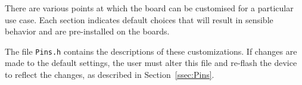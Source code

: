 \documentclass[11pt]{report}
\begin{document}
There are various points at which the board can be customised for a particular use case. Each section indicates default choices that will result in sensible behavior and are pre-installed on the boards. 

The file {\tt Pins.h} contains the descriptions of these customizations. If changes are made to the default settings, the user must alter this file and re-flash the device to reflect the changes, as described in Section~\ref{ssec:Pins}. 








\end{document}
